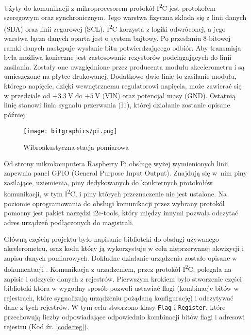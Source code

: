 \documentclass[a4paper,12pt]{mwart}
\begin{document}
Użyty do komunikacji z mikroprocesorem protokół I\textsuperscript{2}C jest
protokołem szeregowym oraz synchronicznym. Jego warstwa fizyczna składa się z
linii danych (SDA) oraz linii zegarowej (SCL). I\textsuperscript{2}C korzysta z
logiki odwróconej, a jego warstwa łącza danych oparta jest o system bajtowy. Po
przesłaniu 8-bitowej ramki danych następuje wysłanie bitu potwierdzającego
odbiór. Aby transmisja była możliwa konieczne jest zastosowanie rezystorów
podciągających do linii zasilania. Zostały one uwzględnione przez producenta
modułu akcelerometru i są umieszczone na płytce drukowanej. Dodatkowe dwie
linie to zasilanie modułu, którego napięcie, dzięki wewnętrznemu regulatorowi
napięcia, może zawierać się w przedziale od $+\SI{3.3}{\volt}$ do
$+\SI{5}{\volt}$ (VIN) oraz potencjał masy (GND).  Ostatnią linię stanowi linia
sygnału przerwania (I1), której działanie zostanie opisane później.

\begin{figure}[!tbh]
  \centering
  \texttt{[image: bitgraphics/pi.png]}
  \caption{Wibroakustyczna stacja pomiarowa}
  \label{fig:foto}
\end{figure}

Od strony mikrokomputera Raspberry Pi obsługę wyżej wymienionych linii zapewnia
panel GPIO (General Purpose Input Output). Znajdują się w~nim piny zasilające,
uziemienia, piny dedykowanych do konkretnych protokołów komunikacji, w tym
I\textsuperscript{2}C, i piny których przeznaczenie nie jest ustalone.  Na
poziomie oprogramowania do obsługi komunikacji przez wybrany protokół pomocny
jest pakiet narzędzi {\fontfamily{\ttdefault}\selectfont i2c-tools}, który
między innymi pozwala odczytać adres urządzeń podłączonych do magistrali.

Główną częścią projektu było napisanie biblioteki do obsługi używanego
akcelerometru, oraz kodu który ją wykorzystuje w celu nieprzerwanej akwizycji i
zapisu danych pomiarowych. Dokładne działanie urządzenia zostało opisane w
dokumentacji \cite{mma8451}. Komunikacja z urządzeniem, przez protokół
I\textsuperscript{2}C, polegała na zapisie i odczycie danych z rejestrów.
Pierwszym krokiem było stworzenie części biblioteki która w wygodny sposób
pozwoli ustawiać flagi (kombinacje bitów w rejestrach, które sygnalizują
urządzeniu pożądaną konfigurację) i odczytywać dane z tych rejestrów. W tym
celu stworzono klasy \lstinline|Flag| i \lstinline|Register|, które
przechowują liczby odpowiadające odpowiednio kombinacji bitów flagi i
adresowi rejestru (Kod źr. \ref{code:reg}).
\end{document}
